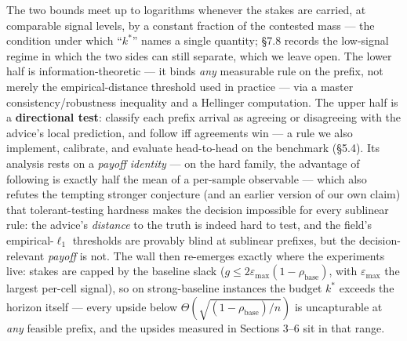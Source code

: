 The two bounds meet up to logarithms whenever the stakes are carried, at
comparable signal levels, by a constant fraction of the contested mass
--- the condition under which ``\(k^*\)'' names a single quantity; §7.8
records the low-signal regime in which the two sides can still separate,
which we leave open. The lower half is information-theoretic --- it
binds \emph{any} measurable rule on the prefix, not merely the
empirical-distance threshold used in practice --- via a master
consistency/robustness inequality and a Hellinger computation. The upper
half is a \textbf{directional test}: classify each prefix arrival as
agreeing or disagreeing with the advice's local prediction, and follow
iff agreements win --- a rule we also implement, calibrate, and evaluate
head-to-head on the benchmark (§5.4). Its analysis rests on a
\emph{payoff identity} --- on the hard family, the advantage of
following is exactly half the mean of a per-sample observable --- which
also refutes the tempting stronger conjecture (and an earlier version of
our own claim) that tolerant-testing hardness
\cite{canonne2022tolerance} makes the decision impossible for every
sublinear rule: the advice's \emph{distance} to the truth is indeed hard
to test, and the field's empirical-\(\ell_1\) thresholds are provably
blind at sublinear prefixes, but the decision-relevant \emph{payoff} is
not. The wall then re-emerges exactly where the experiments live: stakes
are capped by the baseline slack
(\(g \le 2\varepsilon_{\max}(1-\rho_{\mathrm{base}})\), with
\(\varepsilon_{\max}\) the largest per-cell signal), so on
strong-baseline instances the budget \(k^*\) exceeds the horizon itself
--- every upside below \(\Theta(\sqrt{(1-\rho_{\mathrm{base}})/n})\) is
uncapturable at \emph{any} feasible prefix, and the upsides measured in
Sections 3--6 sit in that range.


